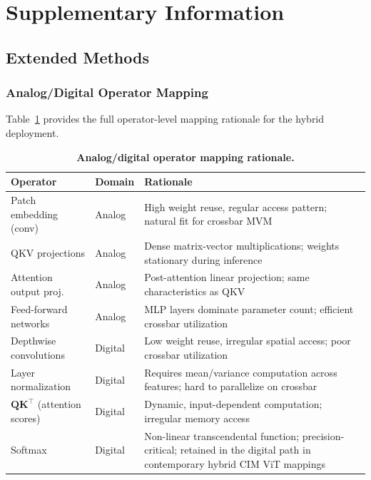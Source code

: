 \section{Supplementary Information}
\label{sec:supplementary}

\renewcommand{\thefigure}{S\arabic{figure}}
\renewcommand{\thetable}{S\arabic{table}}
\setcounter{figure}{0}
\setcounter{table}{0}

\subsection{Extended Methods}
\label{subsec:extended-methods}

\subsubsection{Analog/Digital Operator Mapping}
\label{subsec:supp-operator-mapping}

Table~\ref{tab:supp-operator-mapping} provides the full operator-level mapping rationale for the hybrid deployment.

\begin{table}[ht]
\centering
\caption{\textbf{Analog/digital operator mapping rationale.}}
\label{tab:supp-operator-mapping}
\small
\begin{tabular}{@{}ll>{\raggedright\arraybackslash}p{6.5cm}@{}}
\toprule
\textbf{Operator} & \textbf{Domain} & \textbf{Rationale} \\
\midrule
Patch embedding (conv) & Analog & High weight reuse, regular access pattern; natural fit for crossbar MVM \\
QKV projections & Analog & Dense matrix-vector multiplications; weights stationary during inference \\
Attention output proj. & Analog & Post-attention linear projection; same characteristics as QKV \\
Feed-forward networks & Analog & MLP layers dominate parameter count; efficient crossbar utilization \\
\midrule
Depthwise convolutions & Digital & Low weight reuse, irregular spatial access; poor crossbar utilization \citep{wu2023bwq} \\
Layer normalization & Digital & Requires mean/variance computation across features; hard to parallelize on crossbar \\
$\mathbf{QK}^{\top}$ (attention scores) & Digital & Dynamic, input-dependent computation; irregular memory access \citep{lin2024hardsea} \\
Softmax & Digital & Non-linear transcendental function; precision-critical; retained in the digital path in contemporary hybrid CIM ViT mappings \citep{kim2025hemlet,lin2024hardsea} \\
\bottomrule
\end{tabular}
\end{table}

